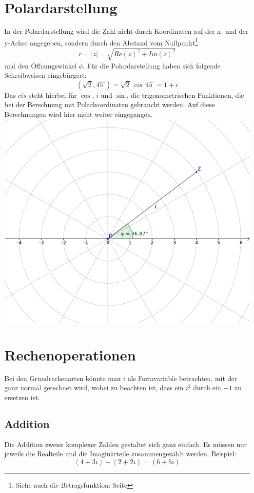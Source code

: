 \documentclass[12pt,a4paper]{scrbook}
\begin{document}
\section{Polardarstellung}
In der Polardarstellung wird die Zahl nicht durch Koordinaten auf der x- und der y-Achse angegeben, sondern
durch den Abstand vom Nullpunkt\footnote{Siehe auch die Betragsfunktion: Seite \pageref{komplex_betrag}}
\[r = \vert z \vert = \sqrt{Re(z)^2 + Im(z)^2} \]
und den Öffnungswinkel $\phi$. Für die Polardarstellung haben sich folgende Schreibweisen eingebürgert:
\[(\sqrt{2}, 45^{\circ}) = \sqrt{2} ~~ cis ~~ 45^{\circ} = 1 + i\]
Das $cis$ steht hierbei für $\cos$, $i$ und $\sin$, die trigonometrischen Funktionen, die bei der Berechnung mit Polarkoordinaten gebraucht werden. Auf diese Berechnungen wird hier nicht weiter eingegangen.\\
\includegraphics[scale=1.5]{img/komplexe_zahlen_polar.pdf}\\

\section{Rechenoperationen}
Bei den Grundrechenarten könnte man $i$ als Formvariable betrachten, mit der ganz normal gerechnet wird, wobei zu beachten ist, dass ein $i^2$ durch ein $-1$ zu
ersetzen ist.
\subsection{Addition}
Die Addition zweier komplexer Zahlen gestaltet sich ganz einfach.
Es müssen nur jeweils die Realteile und die Imaginärteile zusammengezählt werden. Beispiel:
\[(4+3i) + (2+2i) = (6+5i)\]
\end{document}
